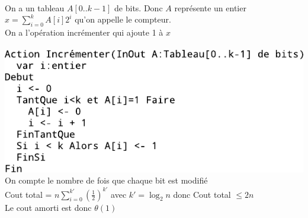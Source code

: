 \\
On a un tableau $A[0..k-1]$ de bits. Donc $A$ représente un entier $x=\displaystyle{\sum_{i=0}^kA[i]2^i}$ qu'on appelle le compteur.\\
On a l'opération incrémenter qui ajoute 1 à $x$ \\
\\
\includegraphics{Images/fig1.pdf}
\\
On compte le nombre de fois que chaque bit est modifié \\
Cout total = $n\displaystyle{\sum_{i=0}^{k'}}(\frac{1}{2})^{k'}$ avec $k'=\log_2 n$ donc Cout total $\leq 2n$ \\
Le cout amorti est donc $\theta(1)$


